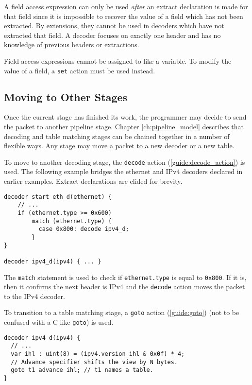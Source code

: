 A field access expression can only be used \textit{after} an extract declaration
is made for that field since it is impossible to recover the value of a
field which has not been extracted. By extensions, they cannot be used in
decoders which have not extracted that field. A decoder focuses on exactly one
header and has no knowledge of previous headers or extractions.

Field access expressions cannot be assigned to like a variable. To modify the
value of a field, a \texttt{set} action must be used instead.

\subsection{Moving to Other Stages} \label{tut:decoder_next}

Once the current stage has finished its work, the programmer may decide
to send the packet to another pipeline stage.
Chapter \ref{ch:pipeline_model} describes that decoding and
table matching stages can be chained together in a number of flexible ways.
Any stage may move a packet to a new decoder or a new table.

To move to another decoding stage, the \texttt{decode} action (\ref{guide:decode_action})
is used. The following example bridges the ethernet and IPv4 decoders
declared in earlier examples. Extract declarations are elided for
brevity.

\begin{codepage}
\begin{lstlisting}
decoder start eth_d(ethernet) {
	// ...
	if (ethernet.type >= 0x600)
	    match (ethernet.type) {
	      case 0x800: decode ipv4_d;
	    }
}

decoder ipv4_d(ipv4) { ... }
\end{lstlisting}
\end{codepage}

The \texttt{match} statement is used to check if \texttt{ethernet.type} is equal to
\texttt{0x800}. If it is, then it confirms the next header is IPv4 and the \texttt{decode} action moves the packet to the IPv4 decoder.

To transition to a table matching stage, a \texttt{goto} action (\ref{guide:goto}) (not
to be confused with a C-like \texttt{goto}) is used.

\begin{codepage}
\begin{lstlisting}
decoder ipv4_d(ipv4) {
  // ...
  var ihl : uint(8) = (ipv4.version_ihl & 0x0f) * 4;
  // Advance specifier shifts the view by N bytes.
  goto t1 advance ihl; // t1 names a table.
}
\end{lstlisting}
\end{codepage}

